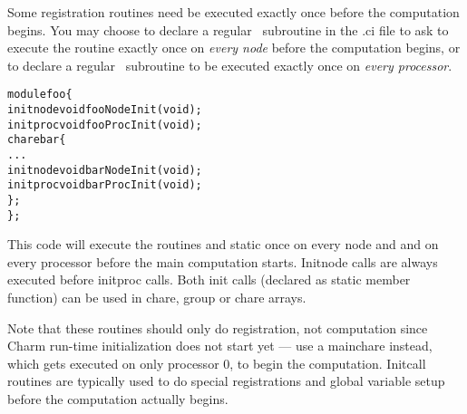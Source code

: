 
\label{initcall}
Some registration routines need be executed exactly once
before the computation begins. You may choose to 
declare a regular  \CC\ subroutine  in the .ci file
to ask \charmpp to execute the routine exactly once on {\em every node} 
before the computation begins, or to declare a regular  \CC\ subroutine 
 to be executed exactly once on {\em every processor}.

\begin{alltt}
module foo \{
    initnode void fooNodeInit(void);
    initproc void fooProcInit(void);
    chare bar \{
        ...
        initnode void barNodeInit(void);
        initproc void barProcInit(void);
    \};
\};
\end{alltt}

This code will execute the routines  and static 
 once on every node and 
and  on every processor before the main computation 
starts.
Initnode calls are always executed before initproc calls.
Both init calls (declared as static member function) can be used in chare, 
group or chare arrays.

Note that these routines should only do registration, not computation since
Charm run-time initialization does not start yet ---
use a mainchare instead, which gets executed on only processor 0,
to begin the computation.  Initcall routines are typically
used to do special registrations and global variable setup
before the computation actually begins.

